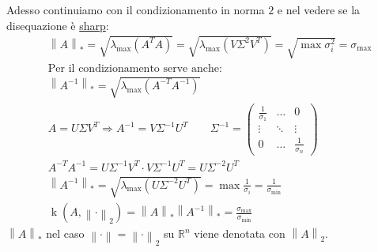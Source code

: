 \documentclass{article}
\begin{document}
Adesso continuiamo con il condizionamento in norma $2$ e nel vedere se la disequazione è \underline{sharp}:
\begin{align*}
     & \left\|A\right\|_*=\sqrt{\lambda_{\mathrm{max}}\left(A^TA\right)}=\sqrt{\lambda_{\mathrm{max}}\left(V\Sigma^2V^T\right)}=\sqrt{\max \sigma_i^2}=\sigma_{\mathrm{max}} \\
     & \text{Per il condizionamento serve anche:}                                                                                                                            \\
     & \left\|A^{-1}\right\|_*=\sqrt{\lambda_{\mathrm{max}}\left(A^{-T}A^{-1}\right)}                                                                                        \\
     & A=U\Sigma V^T\Rightarrow A^{-1}=V\Sigma^{-1}U^T\qquad\Sigma^{-1}=\begin{pmatrix}
                                                                            \frac{1}{\sigma_1} & \dots  & 0                  \\
                                                                            \vdots             & \ddots & \vdots             \\
                                                                            0                  & \dots  & \frac{1}{\sigma_n}
                                                                        \end{pmatrix}                                                     \\
     & A^{-T}A^{-1}=U\Sigma^{-1}V^T\cdot V\Sigma^{-1}U^T=U\Sigma^{-2}U^T                                                                                                     \\
     & \left\|A^{-1}\right\|_*=\sqrt{\lambda_{\mathrm{max}}\left(U\Sigma^{-2}U^T\right)}=\max\frac{1}{\sigma_i}=\frac{1}{\sigma_{\mathrm{min}}}                              \\
     & \boxed{\operatorname{k}\left(A,\left\|\cdot\right\|_2\right)=\left\|A\right\|_*\left\|A^{-1}\right\|_*=\frac{\sigma_{\mathrm{max}}}{\sigma_{\mathrm{min}}}}
\end{align*}
$\left\|A\right\|_*$ nel caso $\left\|\cdot\right\|=\left\|\cdot\right\|_2$ su $\mathbb R^n$ viene denotata con $\left\|A\right\|_2$.\\
\end{document}
